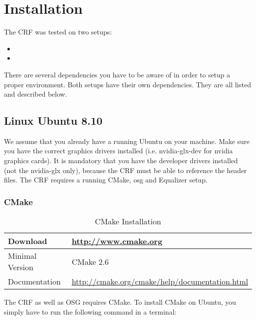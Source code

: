\section{Installation}

The CRF was tested on two setups:

\begin{itemize}
	\item {}
	\item {}
\end{itemize}

There are several dependencies you have to be aware of in order to setup a proper environment. Both setups have their own dependencies. They are all listed and described below.

\subsection{Linux Ubuntu 8.10}
\label{sec:ubuntu_setup}

We assume that you already have a running Ubuntu on your machine. Make sure you have the correct graphics drivers installed (i.e. nvidia-glx-dev for nvidia graphics cards). It is mandatory that you have the developer drivers installed (not the nvidia-glx only), because the CRF must be able to reference the header files. The CRF requires a running CMake, \gls{osg} and Equalizer setup.

\subsubsection{CMake}
\begin{table}[H]
	\centering
	\begin{tabular}{|p{}|p{}|}
		\hline Download & \href{http://www.cmake.org}{http://www.cmake.org} \\
		\hline Minimal Version & CMake 2.6 \\
		\hline Documentation & \href{http://cmake.org/cmake/help/documentation.html}{http://cmake.org/cmake/help/documentation.html} \\
		\hline
	\end{tabular}
	\caption{CMake Installation}
\end{table}

The CRF as well as OSG requires CMake. To install CMake on Ubuntu, you simply have to run the following command in a terminal:

